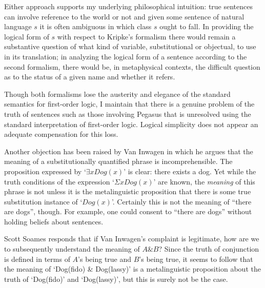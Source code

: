 \documentclass[12pt,a4paper]{article}
\begin{document}
Either approach supports my underlying philosophical intuition: true
sentences can involve reference to the world or not and given some
sentence of natural language $s$ it is often ambiguous in which class
$s$ ought to fall.  In providing the logical form of $s$ with respect
to Kripke's formalism there would remain a substantive question of
what kind of variable, substitutional or objectual, to use in its
translation; in analyzing the logical form of a sentence according to
the second formalism, there would be, in metaphysical contexts,
the difficult question as to the status of a given name and whether it
refers.

Though both formalisms lose the austerity and elegance of the standard
semantics for first-order logic, I maintain that there is a genuine
problem of the truth of sentences such as those involving Pegasus that
is unresolved using the standard interpretation of first-order logic.
Logical simplicity does not appear an adequate compensation for this
loss.

Another objection has been raised by Van Inwagen \cite{inwagen} in
which he argues that the meaning of a substitutionally quantified
phrase is incomprehensible.  The proposition expressed by `$\exists
xDog(x)$' is clear: there exists a dog. Yet while the truth conditions
of the expression `$\Sigma xDog(x)$' are known, the \emph{meaning} of
this phrase is not unless it is the metalinguistic proposition that
there is some true substitution instance of `$Dog(x)$'.  Certainly this
is not the meaning of ``there are dogs'', though.  For example, one
could consent to ``there are dogs'' without holding beliefs about
sentences.

Scott Soames \cite[p.91]{soames} responds that if Van Inwagen's
complaint is legitimate, how are we to subsequently understand the
meaning of $A \& B$?  Since the truth of conjunction is defined in
terms of $A$'s being true and $B$'s being true, it seems to follow
that the meaning of `Dog(fido) \& Dog(lassy)' is a metalinguistic
proposition about the truth of `Dog(fido)' and `Dog(lassy)', but
this is surely not be the case.
\end{document}
